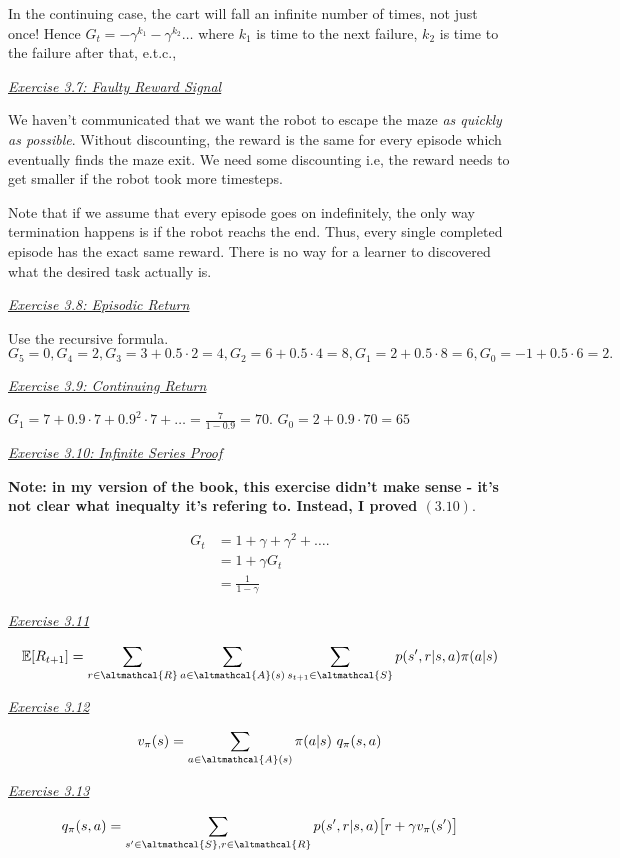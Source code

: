 \documentclass{article}
\newcommand{\myq}[1]{%
	\vspace{1em}
	\noindent\underline{\emph{Exercise #1}}\vspace{0.25em}\linebreak
}
\begin{document}
In the continuing case, the cart will fall an infinite number of times, not just once! Hence $G_t = -\gamma^{k_1} -\gamma^{k_2} \dots$ where $k_1$ is time to the next failure, $k_2$ is time to the failure after that, e.t.c.,

\myq{3.7: Faulty Reward Signal}
We haven't communicated that we want the robot to escape the maze \emph{as quickly as possible}. Without discounting, the reward is the same for every episode which eventually finds the maze exit. We need some discounting i.e, the reward needs to get smaller if the robot took more timesteps. 

Note that if we assume that every episode goes on indefinitely, the only way termination happens is if the robot reachs the end. Thus, every single completed episode has the exact same reward. There is no way for a learner to discovered what the desired task actually is. 

\myq{3.8: Episodic Return}
Use the recursive formula. $G_5 = 0, G_4 = 2, G_3 = 3 + 0.5 \cdot 2 = 4, G_2 = 6 + 0.5\cdot4 = 8, G_1 = 2 + 0.5\cdot8 = 6, G_0 = -1 + 0.5\cdot 6 = 2.$ 

\myq{3.9: Continuing Return}
$G_1 = 7 + 0.9\cdot7 + 0.9^2\cdot 7 + \dots = \frac{7}{1-0.9}=70$. 
$G_0 = 2 + 0.9 \cdot 70 = 65$

\myq{3.10: Infinite Series Proof}
\textbf{Note: in my version of the book, this exercise didn't make sense - it's not clear what inequalty it's refering to. Instead, I proved $(3.10)$}.

\begin{align}
G_t &= 1 + \gamma + \gamma^2 + \dots. \nonumber \\
 &= 1 + \gamma G_t \nonumber \\
 &= \frac{1}{1 - \gamma} 
\end{align}

\myq{3.11}
\begin{align}
\mathbb{E}[R_{t+1}]=  \sum_{r \in \altmathcal{R}} \sum_{a \in \altmathcal{A}(s)} \sum_{s_{t+1} \in \altmathcal{S}} p(s', r | s, a) \pi(a | s)
\end{align}

\myq{3.12}
\begin{align}
v_\pi(s) = \sum_{a \in \altmathcal{A}(s)} \pi(a|s)\ q_\pi(s, a)
\end{align}

\myq{3.13}
\begin{align}
q_\pi(s, a) = \sum_{s' \in \altmathcal{S}, r \in \altmathcal{R}} p(s', r | s, a) \big[ r + \gamma v_\pi(s') \big]
\end{align}
\end{document}
